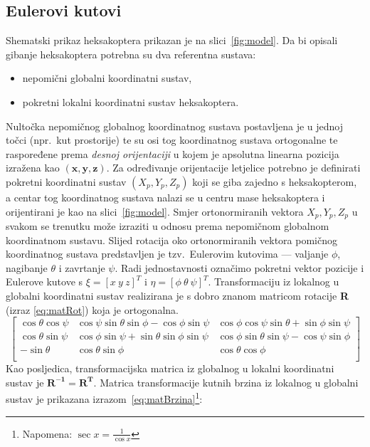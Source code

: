 \documentclass[times, utf8, diplomski]{fer}
\begin{document}
\subsection{Eulerovi kutovi}\label{sec:Euler}
Shematski prikaz heksakoptera prikazan je na slici~\ref{fig:model}. Da bi opisali gibanje heksakoptera potrebna su dva referentna sustava:\begin{itemize}
\item nepomični globalni koordinatni sustav,
\item pokretni lokalni koordinatni sustav heksakoptera.
\end{itemize}
Nultočka nepomičnog globalnog koordinatnog sustava postavljena je u jednoj točci (npr.~kut prostorije) te su osi tog koordinatnog sustava ortogonalne te raspoređene prema \emph{desnoj orijentaciji} u kojem je apsolutna linearna pozicija izražena kao $(\mathbf{x,y,z})$. Za određivanje orijentacije letjelice potrebno je definirati pokretni koordinatni sustav $(X_p,Y_p,Z_p)$ koji se giba zajedno s heksakopterom, a centar tog koordinatnog sustava nalazi se u centru mase heksakoptera i orijentirani je kao na slici~\ref{fig:model}. Smjer ortonormiranih vektora $X_p,Y_p,Z_p$ u svakom se trenutku može izraziti u odnosu prema nepomičnom globalnom koordinatnom sustavu. Slijed rotacija oko ortonormiranih vektora pomičnog koordinatnog sustava predstavljen je tzv.~Eulerovim kutovima --- valjanje  $\phi$, nagibanje  $\theta$ i zavrtanje  $\psi$. Radi jednostavnosti označimo pokretni vektor pozicije i Eulerove kutove s $\xi = [x ~y ~z]^T$ i $\eta = [\phi ~\theta ~\psi]^T$. Transformaciju iz  lokalnog u globalni koordinatni sustav realizirana je s dobro znanom matricom rotacije \textbf{R} (izraz \ref{eq:matRot}) koja je ortogonalna.
\begin{equation}
	\begin{bmatrix}
	\cos\theta\cos\psi & \cos\psi\sin\theta\sin\phi-\cos\phi\sin\psi & \cos\phi\cos\psi\sin\theta+\sin\phi\sin\psi \\
	\cos\theta\sin\psi & \cos\phi\sin\psi+\sin\theta\sin\phi\sin\psi & \cos\phi\sin\theta\sin\psi-\cos\psi\sin\phi \\
	-\sin\theta & \cos\theta\sin\phi & \cos\theta\cos\phi \\
	\end{bmatrix}
	\label{eq:matRot}
\end{equation}
Kao posljedica, transformacijska matrica iz globalnog u lokalni koordinatni sustav je $\mathbf{R^{-1} = R^{T}}$. Matrica transformacije kutnih brzina iz lokalnog u globalni sustav je prikazana izrazom~\ref{eq:matBrzina}\footnote{Napomena: $\sec x = \frac{1}{\cos x}$}:
\end{document}
